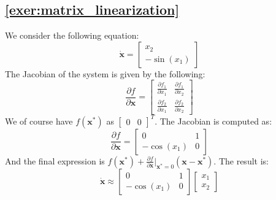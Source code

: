 \subsection*{\texorpdfstring{\autoref{exer:matrix_linearization}}{Matrix Linearization}}
We consider the following equation:
$$\bm{\dot{x}}=\begin{bmatrix}
x_2\\
-\sin(x_1)
\end{bmatrix}$$
The Jacobian of the system is given by the following:
$$\frac{\partial f}{\partial \bm{x}}=\begin{bmatrix}
\frac{\partial f_1}{\partial x_1}&\frac{\partial f_1}{\partial x_2}\\\frac{\partial f_2}{\partial x_1}&\frac{\partial f_2}{\partial x_2}
\end{bmatrix}$$
We of course have $f(\bm{x^*})$ as $\begin{bmatrix}
    0&0
\end{bmatrix}^T$. The Jacobian is computed as:
$$\frac{\partial f}{\partial \bm{x}}=\begin{bmatrix}
    0&1\\-\cos(x_1)&0
\end{bmatrix}$$
And the final expression is $f(\bm{x^*})+\frac{\partial f}{\partial \bm{x}}\big\vert_{\bm{x^*}=0}(\bm{x}-\bm{x^*})$. The result is:
$$\bm{\dot{x}}\approx\begin{bmatrix}
    0&1\\-\cos(x_1)&0
\end{bmatrix}\begin{bmatrix}
x_1\\x_2
\end{bmatrix}$$


\printglossary[title=Special Terms, toctitle = Special Terms]
\printbibliography[heading=bibintoc, title={References}]
